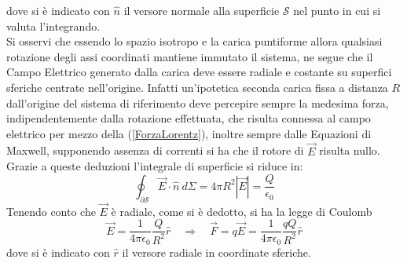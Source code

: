 dove si è indicato con $\hat{n}$ il versore normale alla superficie $\mathcal{S}$ nel punto in cui si valuta l'integrando.\\
Si osservi che essendo lo spazio 
isotropo e la carica puntiforme allora qualsiasi rotazione degli assi coordinati mantiene immutato il sistema, ne segue che 
il Campo Elettrico generato dalla carica deve essere radiale e costante su superfici sferiche centrate nell'origine. Infatti un'ipotetica seconda carica 
fissa a distanza $R$ dall'origine del sistema di riferimento deve percepire sempre la medesima forza, indipendentemente dalla rotazione effettuata, 
che risulta connessa al campo elettrico per mezzo della (\ref{ForzaLorentz}), inoltre sempre dalle Equazioni di Maxwell, supponendo assenza di correnti 
si ha che il rotore di $\vec{E}$ risulta nullo. Grazie a queste deduzioni l'integrale di superficie si riduce in:
\begin{equation*}
	\oint_{\partial\mathcal{S}}\vec{E}\cdot\hat{n}\ d\Sigma=4\pi R^2|\vec{E}|=\frac{Q}{\epsilon_0}
\end{equation*}	
Tenendo conto che $\vec{E}$ è radiale, come si è dedotto, si ha la legge di Coulomb
\begin{equation}
	\vec{E}=\frac{1}{4\pi\epsilon_0}\frac{Q}{R^2}\hat{r} \quad \Rightarrow \quad \vec{F}=q\vec{E}=\frac{1}{4\pi\epsilon_0}\frac{qQ}{R^2}\hat{r}
\end{equation} 
dove si è indicato con $\hat{r}$ il versore radiale in coordinate sferiche.\\

